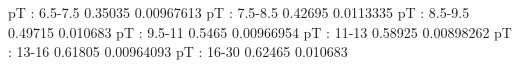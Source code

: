 pT : 6.5-7.5
0.35035 0.00967613
pT : 7.5-8.5
0.42695 0.0113335
pT : 8.5-9.5
0.49715 0.010683
pT : 9.5-11
0.5465 0.00966954
pT : 11-13
0.58925 0.00898262
pT : 13-16
0.61805 0.00964093
pT : 16-30
0.62465 0.010683
